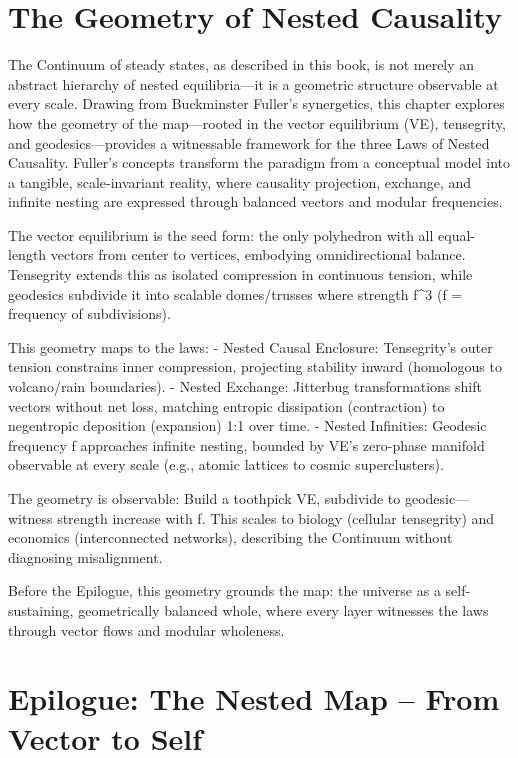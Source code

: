 \chapter{The Geometry of Nested Causality}

The Continuum of steady states, as described in this book, is not merely an abstract hierarchy of nested equilibria—it is a geometric structure observable at every scale. Drawing from Buckminster Fuller's synergetics, this chapter explores how the geometry of the map—rooted in the vector equilibrium (VE), tensegrity, and geodesics—provides a witnessable framework for the three Laws of Nested Causality. Fuller's concepts transform the paradigm from a conceptual model into a tangible, scale-invariant reality, where causality projection, exchange, and infinite nesting are expressed through balanced vectors and modular frequencies.

The vector equilibrium is the seed form: the only polyhedron with all equal-length vectors from center to vertices, embodying omnidirectional balance. Tensegrity extends this as isolated compression in continuous tension, while geodesics subdivide it into scalable domes/trusses where strength \propto f^3 (f = frequency of subdivisions).

This geometry maps to the laws:  
- Nested Causal Enclosure: Tensegrity's outer tension constrains inner compression, projecting stability inward (homologous to volcano/rain boundaries).  
- Nested Exchange: Jitterbug transformations shift vectors without net loss, matching entropic dissipation (contraction) to negentropic deposition (expansion) 1:1 over time.  
- Nested Infinities: Geodesic frequency f \to \infty approaches infinite nesting, bounded by VE's zero-phase manifold observable at every scale (e.g., atomic lattices to cosmic superclusters).

The geometry is observable: Build a toothpick VE, subdivide to geodesic—witness strength increase with f. This scales to biology (cellular tensegrity) and economics (interconnected networks), describing the Continuum without diagnosing misalignment.

Before the Epilogue, this geometry grounds the map: the universe as a self-sustaining, geometrically balanced whole, where every layer witnesses the laws through vector flows and modular wholeness.

\chapter*{Epilogue: The Nested Map – From Vector to Self}

